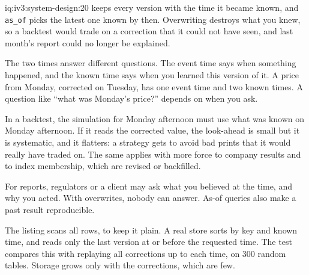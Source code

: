 \begin{solution}{iq:iv3:system-design:20}
 keeps every version with the time it became known, and \texttt{as\_of} picks the latest one known by then. Overwriting destroys what you knew, so a backtest would trade on a correction that it could not have seen, and last month's report could no longer be explained.
\label{lst:iv3:sd:bitemp}

The two times answer different questions. The event time says when something happened, and the known time says when you learned this version of it. A price from Monday, corrected on Tuesday, has one event time and two known times. A question like ``what was Monday's price?'' depends on when you ask.

In a backtest, the simulation for Monday afternoon must use what was known on Monday afternoon. If it reads the corrected value, the look-ahead is small but it is systematic, and it flatters: a strategy gets to avoid bad prints that it would really have traded on. The same applies with more force to company results and to index membership, which are revised or backfilled.

For reports, regulators or a client may ask what you believed at the time, and why you acted. With overwrites, nobody can answer. As-of queries also make a past result reproducible.

The listing scans all rows, to keep it plain. A real store sorts by key and known time, and reads only the last version at or before the requested time. The test compares this with replaying all corrections up to each time, on 300 random tables. Storage grows only with the corrections, which are few.

\end{solution}

